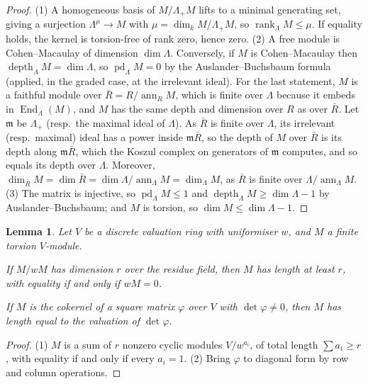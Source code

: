 \documentclass[11pt]{amsart}
\numberwithin{table}{section}
\numberwithin{figure}{section}
\numberwithin{equation}{section}
\newtheorem{lem}[thm]{Lemma}
\theoremstyle{definition}
\theoremstyle{plain}
\DeclareMathOperator{\End}{End}
\DeclareMathOperator{\rank}{rank}
\DeclareMathOperator{\pd}{pd}
\begin{document}
\begin{proof}
(1) A homogeneous basis of $M/\Lambda_+M$ lifts to a minimal generating set, giving a surjection $\Lambda^\mu \to M$ with $\mu = \dim_k M/\Lambda_+M$, so $\rank_\Lambda M \le \mu$. If equality holds, the kernel is torsion-free of rank zero, hence zero. (2) A free module is Cohen--Macaulay of dimension $\dim \Lambda$. Conversely, if $M$ is Cohen--Macaulay then $\operatorname{depth}_\Lambda M = \dim \Lambda$, so $\pd_\Lambda M = 0$ by the Auslander--Buchsbaum formula (applied, in the graded case, at the irrelevant ideal). For the last statement, $M$ is a faithful module over $\bar R = R/\operatorname{ann}_R M$, which is finite over $\Lambda$ because it embeds in $\End_\Lambda (M)$, and $M$ has the same depth and dimension over $R$ as over $\bar R$. Let $\mathfrak m$ be $\Lambda_+$ (resp.\ the maximal ideal of $\Lambda$). As $\bar R$ is finite over $\Lambda$, its irrelevant (resp.\ maximal) ideal has a power inside $\mathfrak m\bar R$, so the depth of $M$ over $\bar R$ is its depth along $\mathfrak m\bar R$, which the Koszul complex on generators of $\mathfrak m$ computes, and so equals its depth over $\Lambda$. Moreover, $\dim_{\bar R} M = \dim \bar R = \dim \Lambda /\operatorname{ann}_\Lambda M = \dim_\Lambda M$, as $\bar R$ is finite over $\Lambda /\operatorname{ann}_\Lambda M$. (3) The matrix is injective, so $\pd_\Lambda M \le 1$ and $\operatorname{depth}_\Lambda M \ge \dim \Lambda - 1$ by Auslander--Buchsbaum; and $M$ is torsion, so $\dim M \le \dim \Lambda - 1$.
\end{proof}

\begin{lem}\label{lem:dvr}
Let $V$ be a discrete valuation ring with uniformiser $w$, and $M$ a finite torsion $V$-module.
\begin{thmlist}
\item If $M/w M$ has dimension $r$ over the residue field, then $M$ has length at least $r$, with equality if and only if $w M = 0$.
\item If $M$ is the cokernel of a square matrix $\varphi$ over $V$ with $\det\varphi \neq 0$, then $M$ has length equal to the valuation of $\det\varphi$.
\end{thmlist}
\end{lem}

\begin{proof}
(1) $M$ is a sum of $r$ nonzero cyclic modules $V/w^{a_i}$, of total length $\sum a_i \ge r$, with equality if and only if every $a_i = 1$. (2) Bring $\varphi$ to diagonal form by row and column operations.
\end{proof}
\end{document}
